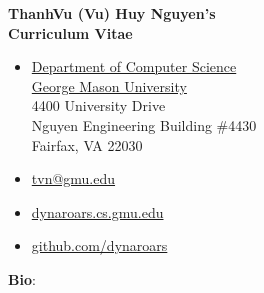 \documentclass[11pt]{article}
\makeatletter
\newcommand{\updateinfo}[1][\today]{\par\vfill\hfill{\faPencil{} \scriptsize \color{darkgray}Last updated on #1}}
\newcommand{\myname}{ThanhVu (Vu) Huy Nguyen}
\newcommand{\myemailwork}{\href{mailto:tvn@gmu.edu}{tvn@gmu.edu}}
\newcommand{\mylab}{\href{https://dynaroars.cs.gmu.edu}{dynaroars.cs.gmu.edu}}
\newcommand{\mysoftware}{\href{https://github.com/dynaroars}{github.com/dynaroars}}
\makeatother
\begin{document}
\thispagestyle{empty}

\begin{center}
    \textbf{\LARGE \myname{}'s\\\vspace{0.15in}Curriculum Vitae}
\end{center}

\vspace{0.15in}
\begin{minipage}{.40\textwidth}
    \footnotesize
    \begin{itemize}[label={}]
        \item \href{https://cs.gmu.edu}{Department of Computer Science}\\
        \href{https://www.gmu.edu}{George Mason University}\\
        4400 University Drive\\
        Nguyen Engineering Building \#4430\\
        Fairfax, VA 22030
    \end{itemize}
\end{minipage}
\hfill
\begin{minipage}{.40\textwidth}
    \footnotesize
    \begin{itemize}[label={}]
        \item \faEnvelope{} \myemailwork{}
        \item \faHome{} \mylab{}
        \item \faGithub{} \mysoftware{}
    \end{itemize}
\end{minipage}




\vspace{0.2in}
\begin{tcolorbox}[colback=gray!5!white,colframe=gray,center,boxrule=0.2pt,width=0.98\textwidth]
    \small \textbf{Bio}: \emph{}
\end{tcolorbox}

\end{document}
